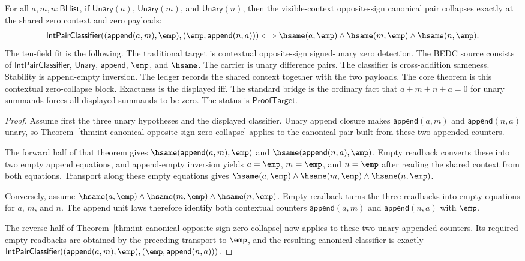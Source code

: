 \begin{theorem}
\label{thm:int-contextual-opposite-sign-zero-collapse}
For all $a,m,n:\mathsf{BHist}$, if $\mathsf{Unary}(a)$,
$\mathsf{Unary}(m)$, and $\mathsf{Unary}(n)$, then the visible-context
opposite-sign canonical pair collapses exactly at the shared zero context and
zero payloads:
$$
\mathsf{IntPairClassifier}((\mathsf{append}(a,m),\emp),(\emp,\mathsf{append}(n,a)))
\Longleftrightarrow
\hsame(a,\emp)\land\hsame(m,\emp)\land\hsame(n,\emp).
$$
The ten-field fit is the following. The traditional target is contextual
opposite-sign signed-unary zero detection. The BEDC source consists of
$\mathsf{IntPairClassifier}$, $\mathsf{Unary}$, $\mathsf{append}$, $\emp$, and
$\hsame$. The carrier is unary difference pairs. The classifier is
cross-addition sameness. Stability is append-empty inversion. The ledger
records the shared context together with the two payloads. The core theorem is
this contextual zero-collapse block. Exactness is the displayed iff. The
standard bridge is the ordinary fact that $a+m+n+a=0$ for unary summands forces
all displayed summands to be zero. The status is $\mathsf{ProofTarget}$.
\end{theorem}
\begin{proof}
Assume first the three unary hypotheses and the displayed classifier. Unary
append closure makes $\mathsf{append}(a,m)$ and $\mathsf{append}(n,a)$ unary, so
Theorem~\ref{thm:int-canonical-opposite-sign-zero-collapse} applies to the
canonical pair built from these two appended counters.

The forward half of that theorem gives
$\hsame(\mathsf{append}(a,m),\emp)$ and
$\hsame(\mathsf{append}(n,a),\emp)$. Empty readback converts these into two
empty append equations, and append-empty inversion yields
$a=\emp$, $m=\emp$, and $n=\emp$ after reading the shared context from both
equations. Transport along these empty equations gives
$\hsame(a,\emp)\land\hsame(m,\emp)\land\hsame(n,\emp)$.

Conversely, assume
$\hsame(a,\emp)\land\hsame(m,\emp)\land\hsame(n,\emp)$. Empty readback turns the
three readbacks into empty equations for $a$, $m$, and $n$. The append unit laws
therefore identify both contextual counters
$\mathsf{append}(a,m)$ and $\mathsf{append}(n,a)$ with $\emp$.

The reverse half of Theorem~\ref{thm:int-canonical-opposite-sign-zero-collapse}
now applies to these two unary appended counters. Its required empty readbacks
are obtained by the preceding transport to $\emp$, and the resulting canonical
classifier is exactly
$\mathsf{IntPairClassifier}((\mathsf{append}(a,m),\emp),(\emp,\mathsf{append}(n,a)))$.
\end{proof}

